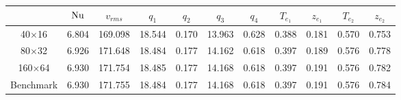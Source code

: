 \begin{tabular}{c|cccccccccc}
    & $\mathrm{Nu}$ & $v_{rms}$ & $q_1$ & $q_2$ & $q_3$ & $q_4$ & $T_{e_1}$ & $z_{e_1}$ & $T_{e_2}$ & $z_{e_2}$ \\
\hline
40$\times$16 & 6.804 & 169.098 & 18.544 & 0.170 & 13.963 & 0.628 & 0.388 & 0.181 & 0.570 & 0.753 \\
80$\times$32 & 6.926 & 171.648 & 18.484 & 0.177 & 14.162 & 0.618 & 0.397 & 0.189 & 0.576 & 0.778 \\
160$\times$64 & 6.930 & 171.754 & 18.485 & 0.177 & 14.168 & 0.618 & 0.397 & 0.191 & 0.576 & 0.782 \\
\hline
Benchmark & 6.930 & 171.755 & 18.484 & 0.177 & 14.168 & 0.618 & 0.397 & 0.191 & 0.576 & 0.784 \\
\end{tabular}
